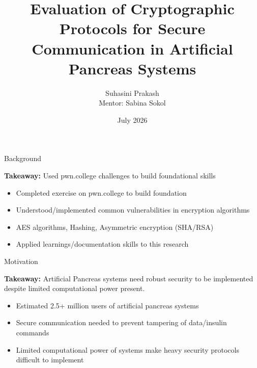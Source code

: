 \documentclass[aspectratio=169]{beamer}
\title[Cryptographic Protocols: Artificial Pancreas]{Evaluation of Cryptographic Protocols for Secure Communication in Artificial Pancreas Systems}
\author[Suhasini P.]{Suhasini Prakash\\ {\small Mentor: Sabina Sokol}}
\institute[]{Institute for Computing in Research}
\date{July 2026}
\begin{document}
\begin{frame}[plain] 
    \titlepage
\end{frame}

\begin{frame}[t]{Background}
    \begin{alertblock}{}
        \centering
        \footnotesize\textbf{Takeaway: } Used pwn.college challenges to build foundational skills
    \end{alertblock}
    \vspace{1.4cm}
    \begin{itemize}
        \item Completed exercise on pwn.college to build foundation
        \item Understood/implemented common vulnerabilities in encryption algorithms
        \item AES algorithms, Hashing, Asymmetric encryption (SHA/RSA)
        \item Applied learnings/documentation skills to this research
    \end{itemize}

\end{frame}


\begin{frame}[t]{Motivation}
    \begin{alertblock}{}
        \centering
        \footnotesize\textbf{Takeaway: } Artificial Pancreas systems need robust security to be implemented despite limited computational power present.
    \end{alertblock}
    \vspace{.8cm}
    \begin{itemize}
        \item Estimated 2.5+ million users of artificial pancreas systems
        \item Secure communication needed to prevent tampering of data/insulin commands
        \item Limited computational power of systems make heavy security protocols difficult to implement 
    \end{itemize}
    
\end{frame}
\end{document}
